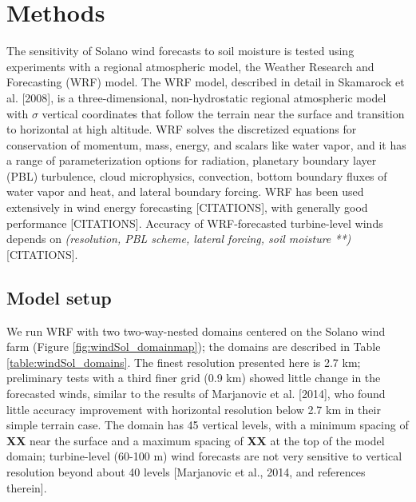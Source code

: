 
%
%
%
%
%

\section{Methods}

The sensitivity of Solano wind forecasts to soil moisture is tested using experiments with a regional atmospheric model, the Weather Research and Forecasting (WRF) model.  The WRF model, described in detail in Skamarock et al. [2008], is a three-dimensional, non-hydrostatic regional atmospheric model with $\sigma$ vertical coordinates that follow the terrain near the surface and transition to horizontal at high altitude.  WRF solves the discretized equations for conservation of momentum, mass, energy, and scalars like water vapor, and it has a range of parameterization options for radiation, planetary boundary layer (PBL) turbulence, cloud microphysics, convection, bottom boundary fluxes of water vapor and heat, and lateral boundary forcing.  WRF has been used extensively in wind energy forecasting [CITATIONS], with generally good performance [CITATIONS].  Accuracy of WRF-forecasted turbine-level winds depends on \textit{(resolution, PBL scheme, lateral forcing, soil moisture **)} [CITATIONS].

\subsection{Model setup}

We run WRF with two two-way-nested domains centered on the Solano wind farm (Figure \ref{fig:windSol_domainmap}); the domains are described in Table \ref{table:windSol_domains}.  The finest resolution presented here is 2.7 km; preliminary tests with a third finer grid (0.9 km) showed little change in the forecasted winds, similar to the results of Marjanovic et al. [2014], who found little accuracy improvement with horizontal resolution below 2.7 km in their simple terrain case.  The domain has 45 vertical levels, with a minimum spacing of \textbf{XX} near the surface and a maximum spacing of \textbf{XX} at the top of the model domain; turbine-level (60-100 m) wind forecasts are not very sensitive to vertical resolution beyond about 40 levels [Marjanovic et al., 2014, and references therein].

